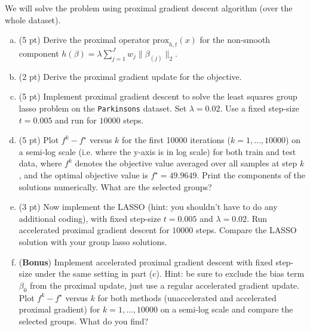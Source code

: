 \documentclass{article}
\theoremstyle{remark}
\theoremstyle{definition}
\begin{document}
\begin{enumerate}[1)]
                We will solve the problem using proximal gradient descent algorithm (over the whole dataset).
    \begin{enumerate}[(a)]
        \item (5 pt) Derive the proximal operator $\text{prox}_{h,t}(x)$ for the non-smooth component $h(\beta) = \lambda \sum_{j=1}^J w_j
  \|\beta_{(j)}\|_2$.
        
        \item (2 pt) Derive the proximal gradient update for the objective.
        
        \item (5 pt) Implement proximal gradient descent to solve the least squares group lasso
    problem on the \texttt{Parkinsons} dataset. Set $\lambda=0.02$. Use a fixed step-size $t=0.005$ and run for $10000$ steps.
    
        \item (5 pt) 
        Plot $f^{k}-f^\star$ versus $k$ for the first 10000 iterations ($k=1, \ldots, 10000$) on a semi-log scale (i.e. where the y-axis is in log scale) for both train and test data, where $f^{k}$ denotes the objective value averaged over all samples at step $k$, and the optimal objective value is $f^\star = 49.9649$.
        Print the components of the solutions numerically. What are the selected groups?
        
        \item (3 pt) Now implement the LASSO (hint: you shouldn't have to do any additional coding), with fixed step-size $t=0.005$ and $\lambda=0.02$. Run accelerated proximal gradient descent for $10000$ steps. Compare the LASSO solution with your group lasso solutions.

        \item (\textbf{Bonus})
                Implement accelerated proximal gradient descent with fixed step-size under the same setting in part (c). Hint: be sure to exclude the bias term $\beta_0$ from the proximal update, just use a regular accelerated gradient update.
        Plot $f^{k}-f^\star$ versus $k$ for both methods (unaccelerated and
        accelerated proximal gradient) for $k=1, \ldots, 10000$ on a semi-log
        scale and compare the selected groups.  What do you find?

    \end{enumerate}
    
\end{enumerate}
\end{document}
